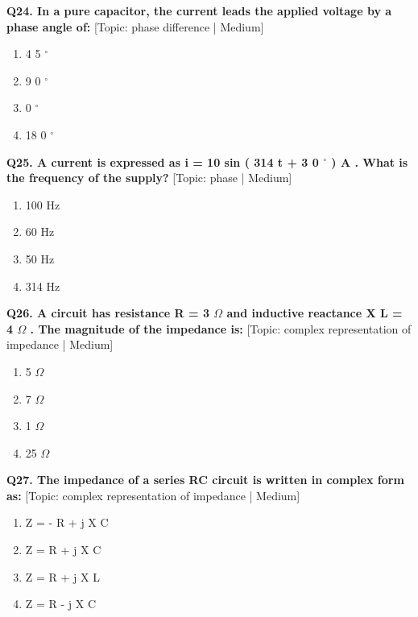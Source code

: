 \noindent\textbf{Q24. In a pure capacitor, the current leads the applied voltage by a phase angle of:} \hfill [Topic: phase difference | Medium]
\begin{enumerate}[label=(\alph*),topsep=2pt,itemsep=1pt,partopsep=0pt,parsep=0pt]
    \item {4 5 $^\circ$}
    \item {9 0 $^\circ$}
    \item {0 $^\circ$}
    \item {18 0 $^\circ$}
\end{enumerate}
\vspace{2mm}

\noindent\textbf{Q25. A current is expressed as i = 10 sin ( 314 t + 3 0 $^\circ$ ) A . What is the frequency of the supply?} \hfill [Topic: phase | Medium]
\begin{enumerate}[label=(\alph*),topsep=2pt,itemsep=1pt,partopsep=0pt,parsep=0pt]
    \item {100 Hz}
    \item {60 Hz}
    \item {50 Hz}
    \item {314 Hz}
\end{enumerate}
\vspace{2mm}

\noindent\textbf{Q26. A circuit has resistance R = 3 $\Omega$ and inductive reactance X L = 4 $\Omega$ . The magnitude of the impedance is:} \hfill [Topic: complex representation of impedance | Medium]
\begin{enumerate}[label=(\alph*),topsep=2pt,itemsep=1pt,partopsep=0pt,parsep=0pt]
    \item {5 $\Omega$}
    \item {7 $\Omega$}
    \item {1 $\Omega$}
    \item {25 $\Omega$}
\end{enumerate}
\vspace{2mm}

\noindent\textbf{Q27. The impedance of a series RC circuit is written in complex form as:} \hfill [Topic: complex representation of impedance | Medium]
\begin{enumerate}[label=(\alph*),topsep=2pt,itemsep=1pt,partopsep=0pt,parsep=0pt]
    \item {Z = - R + j X C}
    \item {Z = R + j X C}
    \item {Z = R + j X L}
    \item {Z = R - j X C}
\end{enumerate}
\vspace{2mm}

